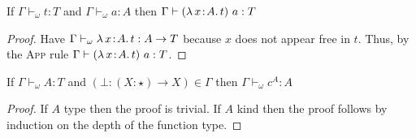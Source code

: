 \begin{lemma}
    \label{lem:3:fomega_eta}
    If $\Gamma \vdash_\omega t : T$ and $\Gamma \vdash_\omega a : A$ then $\Gamma \vdash (\abs{\lambda}{x}{A}{t})\ a : T$
\end{lemma}
\begin{proof}
    Have $\Gamma \vdash_\omega {\lambda}\, x\! : \! A.\, t : A \to T$ because $x$ does not appear free in $t$.
    Thus, by the \textsc{App} rule $\Gamma \vdash (\abs{\lambda}{x}{A}{t})\ a : T$.
\end{proof}

\begin{lemma}
    \label{lem:3:canonical_element}
    If $\Gamma \vdash_\omega A : T$ and $(\bot : (X : \star) \to X) \in \Gamma$ then $\Gamma \vdash_\omega c^A : A$
\end{lemma}
\begin{proof}
    If $A$ type then the proof is trivial.
    If $A$ kind then the proof follows by induction on the depth of the function type.
\end{proof}


